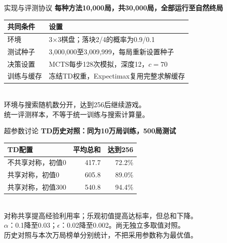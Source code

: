 \documentclass[11pt]{beamer}
\newcommand{\smalltext}{\fontsize{9pt}{12pt}\selectfont}
\begin{document}
\begin{frame}{实现与评测协议}
\textbf{每种方法10,000局，共30,000局，全部运行至自然终局}\\[3mm]
\smalltext\begin{tabularx}{\linewidth}{@{}lX@{}}\toprule 共同条件&设置\\\midrule
环境&3×3棋盘；落块2/4的概率为0.9/0.1\\[2mm]
测试种子&3,000,000至3,009,999，每局重新设置种子\\[2mm]
决策设置&MCTS每步128次模拟，深度12，$c=70$\\[2mm]
训练与缓存&冻结TD权重，Expectimax复用完整求解缓存\\\bottomrule\end{tabularx}\\[3mm]
环境与搜索随机数分开，达到256后继续游戏。\\[2mm]
统一评测样本，不等于统一训练与搜索计算量。
\end{frame}
\begin{frame}{超参数讨论}
\textbf{TD历史对照：同为10万局训练，500局测试}\\[3mm]
\begin{tabularx}{\linewidth}{@{}Xrr@{}}\toprule TD配置&平均总和&达到256\\\midrule
不共享对称，初值0&417.7&72.2\%\\[2mm]
共享对称，初值0&605.8&89.0\%\\[2mm]
共享对称，初值300&540.8&94.4\%\\\bottomrule\end{tabularx}\\[3mm]
\smalltext 对称共享提高经验利用率；乐观初值提高达标率，但总和下降。\\[2mm]
$\alpha$：0.1降至0.03；$\epsilon$：0.02降至0.002。尚无独立多取值对照。\\[2mm]
历史对照与本次万局榜单分别统计，不把采用参数称为最优值。
\end{frame}
\end{document}
